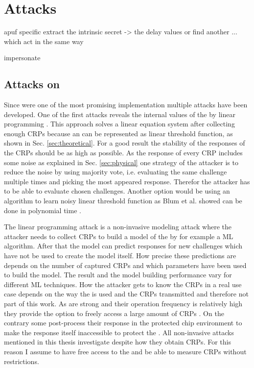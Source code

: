 \chapter{Attacks}



apuf specific
extract the intrinsic secret -> the delay values
or find another ... which act in the same way

impersonate 



\section{Attacks on \apufs}
\label{sec:attacksonarbiter}

Since \apufs were one of the most promising \puf implementation multiple attacks have been developed.
One of the first attacks reveals the internal values of the \apuf by linear programming \cite{Ozturk2008TowardsDevices}.
This approach solves a linear equation system after collecting enough \acp{CRP} because an \apuf can be represented as linear threshold function, as shown in Sec. \ref{sec:theoretical}.
For a good result the stability of the responses of the \acp{CRP} should be as high as possible.
As the response of every \ac{CRP} includes some noise as explained in Sec. \ref{sec:physical} one strategy of the attacker is to reduce the noise by using majority vote, i.e. evaluating the same challenge multiple times and picking the most appeared response.
Therefor the attacker has to be able to evaluate chosen challenges.
Another option would be using an algorithm to learn noisy linear threshold function as Blum et al. showed can be done in polynomial time \cite{Blum1998AlgorithmicaNoisy}.

The linear programming attack is a non-invasive modeling attack where the attacker needs to collect \acp{CRP} to build a model of the \puf by for example a \ac{ML} algorithm.
After that the model can predict responses for new challenges which have not be used to create the model itself.
How precise these predictions are depends on the number of captured \acp{CRP} and which parameters have been used to build the model.
The result and the model building performance vary for different \ac{ML} techniques.
How the attacker gets to know the \acp{CRP} in a real use case depends on the way the \puf is used and the \acp{CRP} transmitted and therefore not part of this work.
As \apufs are strong \pufs and their operation frequency is relatively high they provide the option to freely access a large amount of \acp{CRP} \cite{Ruhrmair2010ModelingFunctions}.
On the contrary some \pufs post-process their response in the protected chip environment to make the \puf response itself inaccessible to protect the \puf \cite{Suh2007PhysicalGeneration, Gassend2004IdentificationCircuits}.
All non-invasive attacks mentioned in this thesis investigate \pufs despite how they obtain \acp{CRP}.
For this reason I assume to have free access to the \puf and be able to measure \acp{CRP} without restrictions.

